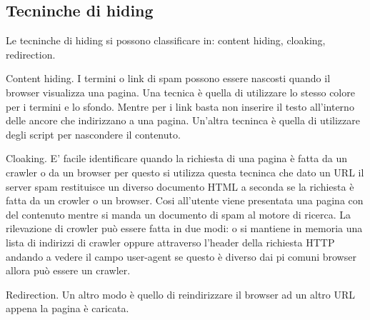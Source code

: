 \subsection{Tecninche di hiding}
Le tecninche di hiding si possono classificare in: content hiding, cloaking, redirection.

Content hiding. I termini o link di spam possono essere nascosti quando il browser visualizza una pagina. Una tecnica è quella di utilizzare lo stesso colore per i termini e lo sfondo. Mentre per i link basta non inserire il testo all'interno delle ancore che indirizzano a una pagina. Un'altra tecninca è quella di utilizzare degli script per nascondere il contenuto.

Cloaking. E' facile identificare quando la richiesta di una pagina è fatta da un crawler o da un browser per questo si utilizza questa tecninca che dato un URL il server spam restituisce un diverso documento HTML a seconda se la richiesta è fatta da un crowler o un browser. Cosi all'utente viene presentata una pagina con del contenuto mentre si manda un documento di spam al motore di ricerca. La rilevazione di crowler può essere fatta in due modi: o si mantiene in memoria una lista di indirizzi di crawler oppure attraverso l'header della richiesta HTTP andando a vedere il campo user-agent se questo è diverso dai pi comuni browser allora può essere un crawler.

Redirection. Un altro modo è quello di reindirizzare il browser ad un altro URL appena la pagina è caricata.

